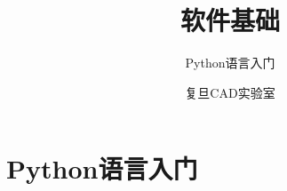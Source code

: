 \documentclass[zihao=-4,twoside]{ctexbook}
\begin{document}
\title{软件基础}
\subtitle{Python语言入门}
\author{复旦CAD实验室}
\makecover
\tableofcontents
\newpage

\chapter{Python语言入门}




\end{document}
